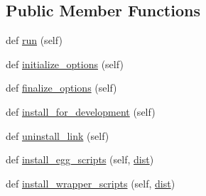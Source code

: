 \subsection*{Public Member Functions}
\begin{DoxyCompactItemize}
\item 
def \hyperlink{classsetuptools_1_1command_1_1develop_1_1develop_abe6f068b17364267fdb2ad80ebd2ead9}{run} (self)
\item 
def \hyperlink{classsetuptools_1_1command_1_1develop_1_1develop_a68852e42237fb4b147f8883ff11003ed}{initialize\+\_\+options} (self)
\item 
def \hyperlink{classsetuptools_1_1command_1_1develop_1_1develop_a869394627f223b3cd23f08a8abcac0b3}{finalize\+\_\+options} (self)
\item 
def \hyperlink{classsetuptools_1_1command_1_1develop_1_1develop_a0334bc03494f1c1b9361789a1f080b36}{install\+\_\+for\+\_\+development} (self)
\item 
def \hyperlink{classsetuptools_1_1command_1_1develop_1_1develop_ac37121318ed4fdec25d3ea3e5574035a}{uninstall\+\_\+link} (self)
\item 
def \hyperlink{classsetuptools_1_1command_1_1develop_1_1develop_abfc03a01676df9150420f8573f159604}{install\+\_\+egg\+\_\+scripts} (self, \hyperlink{classsetuptools_1_1command_1_1develop_1_1develop_afe57f6e30fcbd487d024ab2dfa587630}{dist})
\item 
def \hyperlink{classsetuptools_1_1command_1_1develop_1_1develop_a5553fb3c32f948489fa06b23012b07c9}{install\+\_\+wrapper\+\_\+scripts} (self, \hyperlink{classsetuptools_1_1command_1_1develop_1_1develop_afe57f6e30fcbd487d024ab2dfa587630}{dist})
\end{DoxyCompactItemize}
